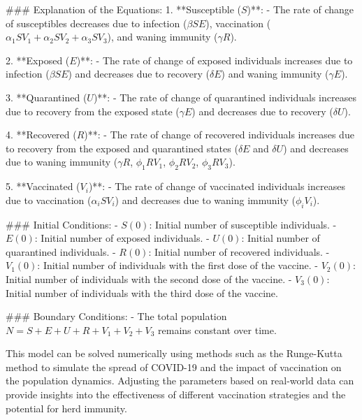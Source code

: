 ### Explanation of the Equations:
1. **Susceptible (\(S\))**:
   - The rate of change of susceptibles decreases due to infection (\(\beta SE\)), vaccination (\(\alpha_1 S V_1 + \alpha_2 S V_2 + \alpha_3 S V_3\)), and waning immunity (\(\gamma R\)).
   
2. **Exposed (\(E\))**:
   - The rate of change of exposed individuals increases due to infection (\(\beta SE\)) and decreases due to recovery (\(\delta E\)) and waning immunity (\(\gamma E\)).
   
3. **Quarantined (\(U\))**:
   - The rate of change of quarantined individuals increases due to recovery from the exposed state (\(\gamma E\)) and decreases due to recovery (\(\delta U\)).
   
4. **Recovered (\(R\))**:
   - The rate of change of recovered individuals increases due to recovery from the exposed and quarantined states (\(\delta E\) and \(\delta U\)) and decreases due to waning immunity (\(\gamma R\), \(\phi_1 R V_1\), \(\phi_2 R V_2\), \(\phi_3 R V_3\)).
   
5. **Vaccinated (\(V_i\))**:
   - The rate of change of vaccinated individuals increases due to vaccination (\(\alpha_i S V_i\)) and decreases due to waning immunity (\(\phi_i V_i\)).

### Initial Conditions:
- \(S(0)\): Initial number of susceptible individuals.
- \(E(0)\): Initial number of exposed individuals.
- \(U(0)\): Initial number of quarantined individuals.
- \(R(0)\): Initial number of recovered individuals.
- \(V_1(0)\): Initial number of individuals with the first dose of the vaccine.
- \(V_2(0)\): Initial number of individuals with the second dose of the vaccine.
- \(V_3(0)\): Initial number of individuals with the third dose of the vaccine.

### Boundary Conditions:
- The total population \(N = S + E + U + R + V_1 + V_2 + V_3\) remains constant over time.

This model can be solved numerically using methods such as the Runge-Kutta method to simulate the spread of COVID-19 and the impact of vaccination on the population dynamics. Adjusting the parameters based on real-world data can provide insights into the effectiveness of different vaccination strategies and the potential for herd immunity.